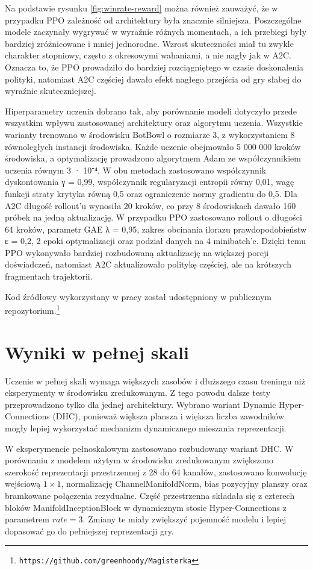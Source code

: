 Na podstawie rysunku \ref{fig:winrate-reward} można również zauważyć, że w przypadku PPO zależność od architektury była znacznie silniejsza. Poszczególne modele zaczynały wygrywać w wyraźnie różnych momentach, a ich przebiegi były bardziej zróżnicowane i mniej jednorodne. Wzrost skuteczności miał tu zwykle charakter stopniowy, często z okresowymi wahaniami, a nie nagły jak w A2C. Oznacza to, że PPO prowadziło do bardziej rozciągniętego w czasie doskonalenia polityki, natomiast A2C częściej dawało efekt nagłego przejścia od gry słabej do wyraźnie skuteczniejszej.

Hiperparametry uczenia dobrano tak, aby porównanie modeli dotyczyło przede wszystkim wpływu zastosowanej architektury oraz algorytmu uczenia. Wszystkie warianty trenowano w środowisku BotBowl o rozmiarze 3, z wykorzystaniem 8 równoległych instancji środowiska. Każde uczenie obejmowało 5 000 000 kroków środowiska, a optymalizację prowadzono algorytmem Adam ze współczynnikiem uczenia równym 3 · 10⁻⁴. W obu metodach zastosowano współczynnik dyskontowania γ = 0,99, współczynnik regularyzacji entropii równy 0,01, wagę funkcji straty krytyka równą 0,5 oraz ograniczenie normy gradientu do 0,5. Dla A2C długość rollout’u wynosiła 20 kroków, co przy 8 środowiskach dawało 160 próbek na jedną aktualizację. W przypadku PPO zastosowano rollout o długości 64 kroków, parametr GAE λ = 0,95, zakres obcinania ilorazu prawdopodobieństw ε = 0,2, 2 epoki optymalizacji oraz podział danych na 4 minibatch’e. Dzięki temu PPO wykonywało bardziej rozbudowaną aktualizację na większej porcji doświadczeń, natomiast A2C aktualizowało politykę częściej, ale na krótszych fragmentach trajektorii.

Kod źródłowy wykorzystany w pracy został udostępniony w publicznym repozytorium.\footnote{\texttt{https://github.com/greenhoody/Magisterka}}

\section{Wyniki w pełnej skali}

Uczenie w pełnej skali wymaga większych zasobów i dłuższego czasu treningu niż eksperymenty w środowisku zredukowanym. Z tego powodu dalsze testy przeprowadzono tylko dla jednej architektury. Wybrano wariant Dynamic Hyper-Connections (DHC), ponieważ większa plansza i większa liczba zawodników mogły lepiej wykorzystać mechanizm dynamicznego mieszania reprezentacji.

W eksperymencie pełnoskalowym zastosowano rozbudowany wariant DHC. W porównaniu z modelem użytym w środowisku zredukowanym zwiększono szerokość reprezentacji przestrzennej z 28 do 64 kanałów, zastosowano konwolucję wejściową $1 \times 1$, normalizację ChannelManifoldNorm, bias pozycyjny planszy oraz bramkowane połączenia rezydualne. Część przestrzenna składała się z czterech bloków ManifoldInceptionBlock w dynamicznym stosie Hyper-Connections z parametrem $rate=3$. Zmiany te miały zwiększyć pojemność modelu i lepiej dopasować go do pełniejszej reprezentacji gry.

